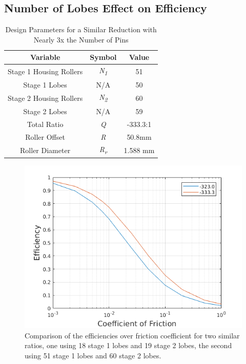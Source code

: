 \subsection{Number of Lobes Effect on Efficiency}\label{ch:dual:discussion:num_lobes}

\begin{table}[!t]
  \vskip0.2cm
  \caption{Design Parameters for a Similar Reduction with Nearly 3x the Number of Pins}
  \label{table:two_stage_high_pins}
  \begin{center}
    \vskip-0.2cm
	\begin{tabular}{|c|c|c|}
		\hline
		Variable & Symbol & Value\\
		\hline
		Stage 1 Housing Rollers & \textit{N\textsubscript{1}} & 51\\
		\hline
		Stage 1 Lobes & N/A & 50\\
		\hline
		Stage 2 Housing Rollers & \textit{N\textsubscript{2}} & 60\\
		\hline
		Stage 2 Lobes & N/A & 59\\
		\hline
		Total Ratio & \textit{Q} & -333.3:1 \\
		\hline
		Roller Offset & \textit{R} & 50.8mm \\
		\hline
		Roller Diameter & \textit{R\textsubscript{r}} & 1.588 mm\\
		\hline
	\end{tabular}
  \end{center}
\end{table}

\begin{figure}[!t]
	\centering
	\includegraphics[width=0.64\linewidth]{fig/two_stage_more_pins}
   \caption{Comparison of the efficiencies over friction coefficient for two similar ratios, one using 18 stage 1 lobes and 19 stage 2 lobes, the second using 51 stage 1 lobes and 60 stage 2 lobes.}
   \label{fig:two_stage_more_pins}
\end{figure}

